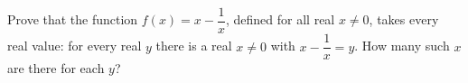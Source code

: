 Prove that the function $f(x)=x-\dfrac{1}{x}$, defined for all real $x\ne0$, takes every real value: for every real $y$ there is a real $x\ne0$ with $x-\dfrac{1}{x}=y$. How many such $x$ are there for each $y$?
